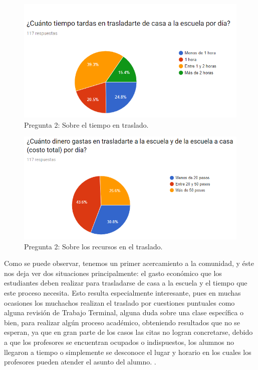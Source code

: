 \begin{figure}[htbp!]
	\centering
	\includegraphics[width=1\textwidth]{intro/images_justificacion/encuesta_horasTraslado}
	\caption{Pregunta 2: Sobre el tiempo en traslado.}
\end{figure}

\pagebreak
\begin{figure}[htbp!]
	\centering
	\includegraphics[width=1\textwidth]{intro/images_justificacion/encuesta_dineroTraslado}
	\caption{Pregunta 2: Sobre los recursos en el traslado.}
\end{figure}

\noindent
\newline
Como se puede observar, tenemos un primer acercamiento a la comunidad, y éste nos deja ver dos situaciones
principalmente: el gasto económico que los estudiantes deben realizar para trasladarse de casa a la escuela
y el tiempo que este proceso necesita. Esto resulta especialmente interesante, pues en muchas ocasiones
los muchachos realizan el traslado por cuestiones puntuales como alguna revisión de Trabajo Terminal, alguna
duda sobre una clase específica o bien, para realizar algún proceso académico, obteniendo resultados que
no se esperan, ya que en gran parte de los casos las citas no logran concretarse, debido a que los profesores
se encuentran ocupados o indispuestos, los alumnos no llegaron a tiempo o simplemente se desconoce el lugar y
horario en los cuales los profesores pueden atender el asunto del alumno. \cite{encuesta}. 

